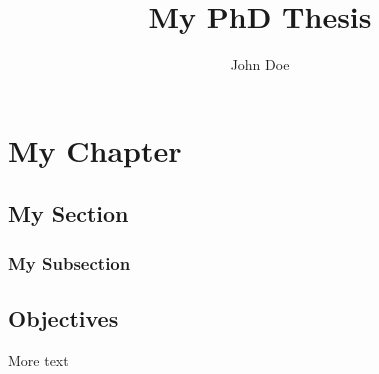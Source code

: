 \documentclass{report}
\title{My PhD Thesis}
\author{John Doe}
\date{}
\begin{document}
\maketitle
\tableofcontents

\chapter{My Chapter}
\section{My Section}
\subsection{My Subsection}


\section{Objectives}
More text

%
%
\end{document}
